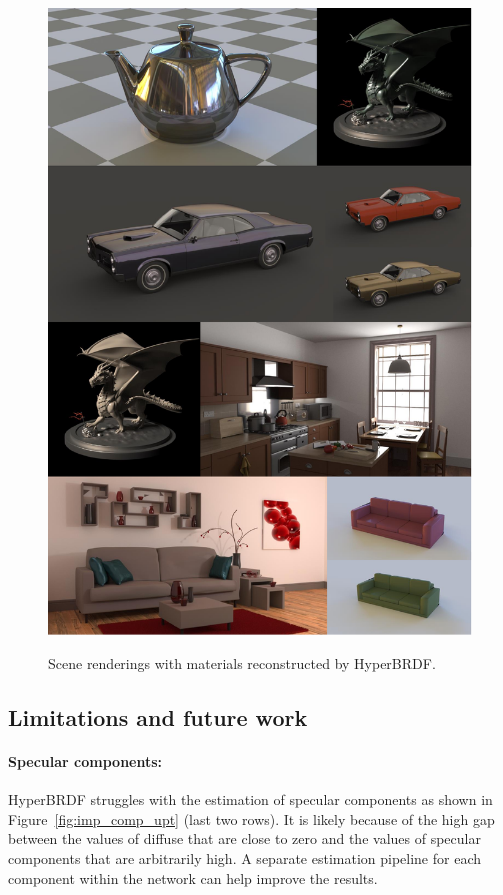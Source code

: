 \begin{figure}[ht]
  \centering
  {\includegraphics[width=\linewidth]{Chapters/hyperbrdf-figs/SceneRenderings1.pdf}}
   \caption{Scene renderings with materials reconstructed by HyperBRDF.}
   \label{fig:scene-render}
\end{figure}

\subsection{Limitations and future work}\label{sec:limits}
\paragraph{Specular components:} HyperBRDF struggles with the estimation of specular components as shown in Figure~\ref{fig:imp_comp_upt} (last two rows). It is likely because of the high gap between the values of diffuse that are close to zero and the values of specular components that are arbitrarily high. A separate estimation pipeline for each component within the network can help improve the results.


